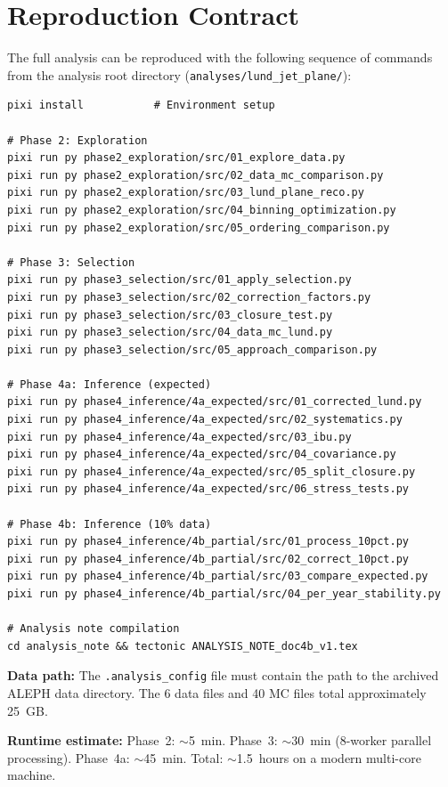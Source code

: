\documentclass[11pt,a4paper]{article}
\begin{document}
\section{Reproduction Contract}
\label{app:reproduction}

The full analysis can be reproduced with the following sequence of
commands from the analysis root directory
(\texttt{analyses/lund\_jet\_plane/}):

{\small
\begin{verbatim}
pixi install           # Environment setup

# Phase 2: Exploration
pixi run py phase2_exploration/src/01_explore_data.py
pixi run py phase2_exploration/src/02_data_mc_comparison.py
pixi run py phase2_exploration/src/03_lund_plane_reco.py
pixi run py phase2_exploration/src/04_binning_optimization.py
pixi run py phase2_exploration/src/05_ordering_comparison.py

# Phase 3: Selection
pixi run py phase3_selection/src/01_apply_selection.py
pixi run py phase3_selection/src/02_correction_factors.py
pixi run py phase3_selection/src/03_closure_test.py
pixi run py phase3_selection/src/04_data_mc_lund.py
pixi run py phase3_selection/src/05_approach_comparison.py

# Phase 4a: Inference (expected)
pixi run py phase4_inference/4a_expected/src/01_corrected_lund.py
pixi run py phase4_inference/4a_expected/src/02_systematics.py
pixi run py phase4_inference/4a_expected/src/03_ibu.py
pixi run py phase4_inference/4a_expected/src/04_covariance.py
pixi run py phase4_inference/4a_expected/src/05_split_closure.py
pixi run py phase4_inference/4a_expected/src/06_stress_tests.py

# Phase 4b: Inference (10% data)
pixi run py phase4_inference/4b_partial/src/01_process_10pct.py
pixi run py phase4_inference/4b_partial/src/02_correct_10pct.py
pixi run py phase4_inference/4b_partial/src/03_compare_expected.py
pixi run py phase4_inference/4b_partial/src/04_per_year_stability.py

# Analysis note compilation
cd analysis_note && tectonic ANALYSIS_NOTE_doc4b_v1.tex
\end{verbatim}
}

\textbf{Data path:} The \texttt{.analysis\_config} file must contain
the path to the archived ALEPH data directory.  The 6 data files and
40 MC files total approximately 25~GB.

\textbf{Runtime estimate:} Phase~2: $\sim$5~min.  Phase~3: $\sim$30~min
(8-worker parallel processing).  Phase~4a: $\sim$45~min.  Total:
$\sim$1.5~hours on a modern multi-core machine.
\end{document}
